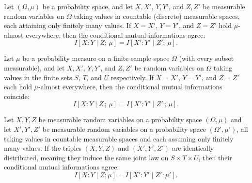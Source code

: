 \begin{theorem}
\label{ProbabilityTheory.condMutualInfo_congr_ae}
\leanok
{}
Let $(\Omega,\mu)$ be a probability space, and let $X,X'$, $Y,Y'$, and $Z,Z'$ be
measurable random variables on $\Omega$ taking values in countable (discrete) measurable
spaces, each attaining only finitely many values. If $X = X'$, $Y = Y'$, and $Z = Z'$
hold $\mu$-almost everywhere, then the conditional mutual informations agree: \[ I[X : Y
\mid Z;\, \mu] = I[X' : Y' \mid Z';\, \mu]. \]
\end{theorem}

\begin{theorem}
\label{ProbabilityTheory.condMutualInfo_congr_ae_finite}
\leanok
{}
Let $\mu$ be a probability measure on a finite sample space $\Omega$ (with every subset
measurable), and let $X, X'$, $Y, Y'$, and $Z, Z'$ be random variables on $\Omega$
taking values in the finite sets $S$, $T$, and $U$ respectively. If $X = X'$, $Y = Y'$,
and $Z = Z'$ each hold $\mu$-almost everywhere, then the conditional mutual informations
coincide: \[ I[X : Y \mid Z\,;\,\mu] = I[X' : Y' \mid Z'\,;\,\mu]. \]
\end{theorem}

\begin{theorem}
\label{ProbabilityTheory.IdentDistrib.condMutualInfo_eq}
\leanok
{}
Let $X,Y,Z$ be measurable random variables on a probability space $(\Omega,\mu)$ and let
$X',Y',Z'$ be measurable random variables on a probability space $(\Omega',\mu')$, all
taking values in countable measurable spaces and each assuming only finitely many
values. If the triples $(X,Y,Z)$ and $(X',Y',Z')$ are identically distributed, meaning
they induce the same joint law on $S\times T\times U$, then their conditional mutual
informations agree: \[ I[X : Y \mid Z;\mu] = I[X' : Y' \mid Z';\mu']. \]
\end{theorem}

